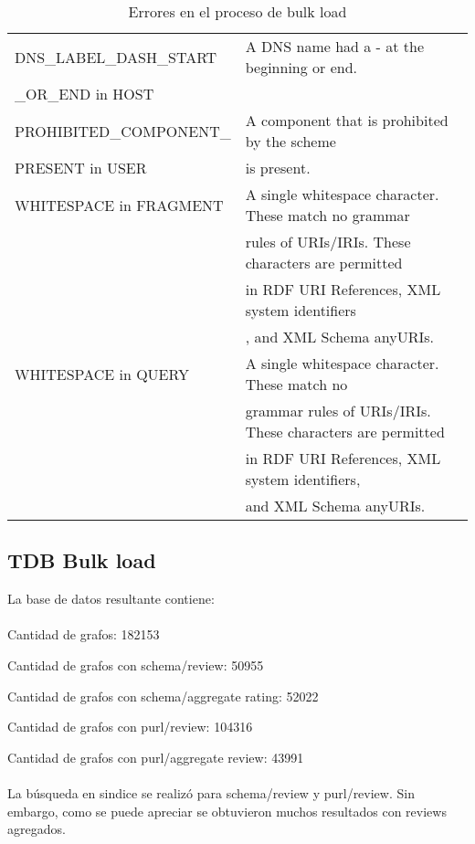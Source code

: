 \begin{table}[h]
\begin{tabular}{| l | l | }
DNS\_LABEL\_DASH\_START& A DNS name had a - at the beginning or end.\\ \_OR\_END in HOST  & \\\hline
PROHIBITED\_COMPONENT\_& A component that is prohibited by the scheme \\ PRESENT in USER  & is present.\\\hline
WHITESPACE in FRAGMENT & A single whitespace character. These match no grammar \\ & rules of URIs/IRIs. These characters are permitted \\ & in RDF URI References, XML system identifiers \\ &, and XML Schema anyURIs.\\\hline
WHITESPACE in QUERY & A single whitespace character. These match no \\ & grammar rules of URIs/IRIs. These characters are permitted \\ & in RDF URI References, XML system identifiers,\\ & and XML Schema anyURIs.\\\hline
\end{tabular}
\caption{Errores en el proceso de bulk load}
\label{table:BulkLoadErrors}
\end{table}

\subsection{TDB Bulk load}

La base de datos resultante contiene:
\\\\
Cantidad de grafos: 182153

\noindent Cantidad de grafos con schema/review: 50955 

\noindent Cantidad de grafos con schema/aggregate rating: 52022

\noindent Cantidad de grafos con purl/review: 104316 

\noindent Cantidad de grafos con purl/aggregate review: 43991
\\\\
La búsqueda en sindice se realizó para schema/review y purl/review. Sin embargo, como se puede apreciar se obtuvieron muchos resultados con reviews agregados.
